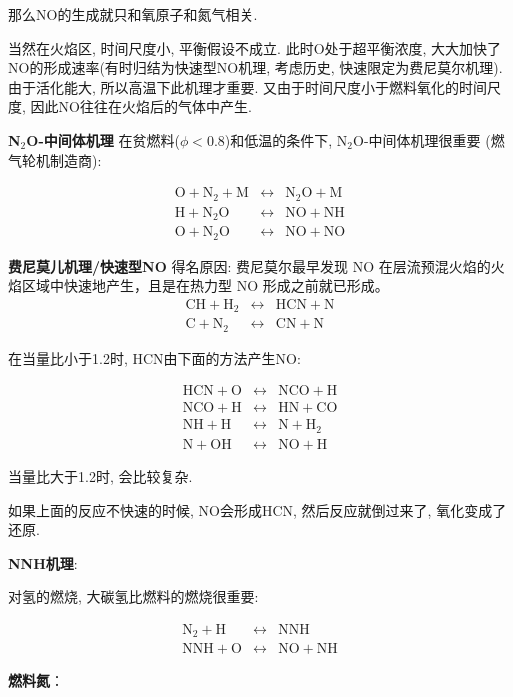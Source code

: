 \documentclass[10pt, landscape]{extarticle}
\numberwithin{equation}{section}
\begin{document}
\begin{multicols}{3}
那么NO的生成就只和氧原子和氮气相关.

当然在火焰区, 时间尺度小, 平衡假设不成立. 此时O处于超平衡浓度, 大大加快了NO的形成速率(有时归结为快速型NO机理, 考虑历史, 快速限定为费尼莫尔机理).
由于活化能大, 所以高温下此机理才重要. 又由于时间尺度小于燃料氧化的时间尺度, 因此NO往往在火焰后的气体中产生.

\textbf{N\(_2\)O-中间体机理}
在贫燃料(\(\phi<0.8\))和低温的条件下, N\(_2\)O-中间体机理很重要 (燃气轮机制造商):

\begin{eqnarray}
    \mathrm{O + N_2 + M} &\leftrightarrow& \mathrm{N_2O + M}\\
    \mathrm{H + N_2O} &\leftrightarrow& \mathrm{NO + NH}\\
    \mathrm{O + N_2O} &\leftrightarrow& \mathrm{NO + NO}
\end{eqnarray}


\textbf{费尼莫儿机理/快速型NO}
得名原因: 费尼莫尔最早发现 NO 在层流预混火焰的火焰区域中快速地产生，且是在热力型 NO 形成之前就已形成。
\begin{eqnarray}
    \mathrm{CH + H_2} &\leftrightarrow& \mathrm{HCN + N}\\
    \mathrm{C + N_2} &\leftrightarrow& \mathrm{CN + N}
\end{eqnarray}

在当量比小于1.2时, HCN由下面的方法产生NO:

\begin{eqnarray}
    \mathrm{HCN + O} &\leftrightarrow& \mathrm{NCO + H} \\
    \mathrm{NCO + H} &\leftrightarrow& \mathrm{HN + CO} \\
    \mathrm{NH + H} &\leftrightarrow& \mathrm{N + H_2} \\
    \mathrm{N + OH} &\leftrightarrow& \mathrm{NO + H}
\end{eqnarray}

当量比大于1.2时, 会比较复杂.

如果上面的反应不快速的时候, NO会形成HCN, 然后反应就倒过来了, 氧化变成了还原.

\textbf{NNH机理}: 

对氢的燃烧, 大碳氢比燃料的燃烧很重要:

\begin{eqnarray}
    \mathrm{N_2 + H} &\leftrightarrow& \mathrm{NNH}\\
    \mathrm{NNH + O} &\leftrightarrow& \mathrm{NO + NH}
\end{eqnarray}

\textbf{燃料氮}：


\end{multicols}
\end{document}
